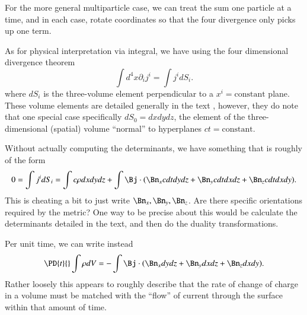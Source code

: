 {For the more general multiparticle case, we can treat the sum one particle at a time, and in each case, rotate coordinates so that the four divergence only picks up one term.

As for physical interpretation via integral, we have using the four dimensional divergence theorem
%
\begin{equation}\label{eqn:relElectroDynProblemSet3:2080}
\int d^4 x \partial_i j^i = \int j^i dS_i.
\end{equation}
%
where \(dS_i\) is the three-volume element perpendicular to a \(x^i = \text{constant}\) plane.  These volume elements are detailed generally in the text \citep{landau1980classical}, however, they do note that one special case specifically \(dS_0 = dx dy dz\), the element of the three-dimensional (spatial) volume ``normal'' to hyperplanes \(ct = \text{constant}\).

Without actually computing the determinants, we have something that is roughly of the form
%
\begin{equation}\label{eqn:relElectroDynProblemSet3:2100}
0
= \int j^i dS_i
=
\int c \rho dx dy dz
+\int \Bj \cdot (\Bn_x c dt dy dz + \Bn_y c dt dx dz + \Bn_z c dt dx dy).
\end{equation}
%
This is cheating a bit to just write \(\Bn_x, \Bn_y, \Bn_z\).  Are there specific orientations required by the metric?  One way to be precise about this would be calculate the determinants detailed in the text, and then do the duality transformations.

Per unit time, we can write instead
\begin{equation}\label{eqn:relElectroDynProblemSet3:2120}
\PD{t}{} \int \rho dV
= -\int \Bj \cdot (\Bn_x dy dz + \Bn_y dx dz + \Bn_z dx dy).
\end{equation}
%
Rather loosely this appears to roughly describe that the rate of change of charge in a volume must be matched with the ``flow'' of current through the surface within that amount of time.

}
